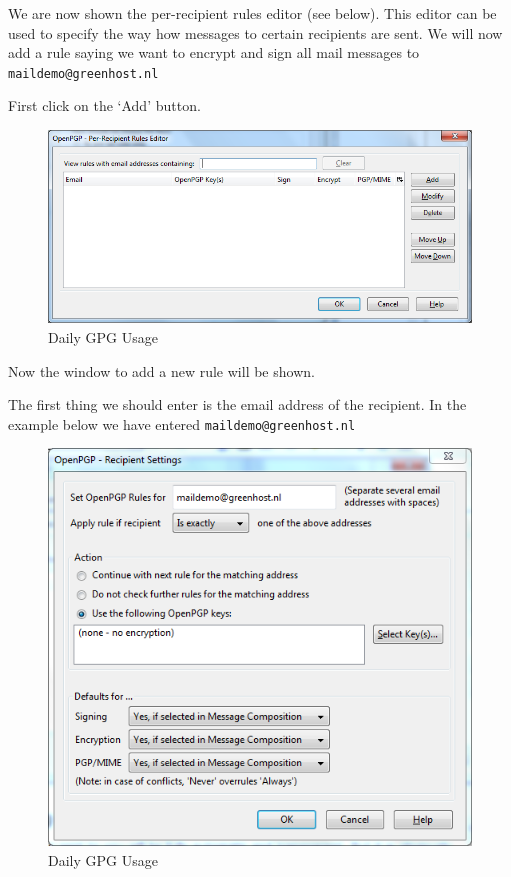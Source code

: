 We are now shown the per-recipient rules editor (see below). This editor
can be used to specify the way how messages to certain recipients are
sent. We will now add a rule saying we want to encrypt and sign all mail
messages to \verb!maildemo@greenhost.nl!

First click on the `Add' button.

\begin{figure}[htbp]
\centering
\includegraphics{daily_gpg_26.png}
\caption{Daily GPG Usage}
\end{figure}

Now the window to add a new rule will be shown.

The first thing we should enter is the email address of the recipient.
In the example below we have entered \verb!maildemo@greenhost.nl!

\begin{figure}[htbp]
\centering
\includegraphics{daily_gpg_27.png}
\caption{Daily GPG Usage}
\end{figure}

